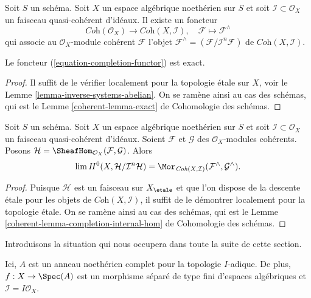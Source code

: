 \noindent
Soit $S$ un schéma. Soit $X$ un espace algébrique noethérien sur $S$ et
soit $\mathcal{I} \subset \mathcal{O}_X$ un faisceau quasi-cohérent d'idéaux.
Il existe un foncteur
\begin{equation}
\label{equation-completion-functor}
\textit{Coh}(\mathcal{O}_X) \longrightarrow \textit{Coh}(X, \mathcal{I}), \quad
\mathcal{F} \longmapsto \mathcal{F}^\wedge
\end{equation}
qui associe au $\mathcal{O}_X$-module cohérent $\mathcal{F}$
l'objet $\mathcal{F}^\wedge = (\mathcal{F}/\mathcal{I}^n\mathcal{F})$
de $\textit{Coh}(X, \mathcal{I})$.

\begin{lemma}
\label{lemma-exact}
Le foncteur (\ref{equation-completion-functor}) est exact.
\end{lemma}

\begin{proof}
Il suffit de le vérifier localement pour la topologie étale sur $X$, voir le
Lemme \ref{lemma-inverse-systems-abelian}.
On se ramène ainsi au cas des schémas, qui est le
Lemme \ref{coherent-lemma-exact} de Cohomologie des schémas.
\end{proof}

\begin{lemma}
\label{lemma-completion-internal-hom}
Soit $S$ un schéma. Soit $X$ un espace algébrique noethérien sur $S$ et
soit $\mathcal{I} \subset \mathcal{O}_X$ un faisceau quasi-cohérent d'idéaux.
Soient $\mathcal{F}$ et $\mathcal{G}$ des $\mathcal{O}_X$-modules cohérents. Posons
$\mathcal{H} = \SheafHom_{\mathcal{O}_X}(\mathcal{F}, \mathcal{G})$.
Alors
$$
\lim H^0(X, \mathcal{H}/\mathcal{I}^n\mathcal{H}) =
\Mor_{\textit{Coh}(X, \mathcal{I})}
(\mathcal{F}^\wedge, \mathcal{G}^\wedge).
$$
\end{lemma}

\begin{proof}
Puisque $\mathcal{H}$ est un faisceau sur $X_\etale$ et que l'on dispose de la
descente étale pour les objets de $\textit{Coh}(X, \mathcal{I})$,
il suffit de le démontrer localement pour la topologie étale.
On se ramène ainsi au cas des schémas, qui est le Lemme
\ref{coherent-lemma-completion-internal-hom} de Cohomologie des schémas.
\end{proof}

\noindent
Introduisons la situation qui nous occupera dans toute la
suite de cette section.

\begin{situation}
\label{situation-existence}
Ici, $A$ est un anneau noethérien complet pour la topologie $I$-adique.
De plus, $f : X \to \Spec(A)$ est un morphisme séparé de type fini
d'espaces algébriques et $\mathcal{I} = I\mathcal{O}_X$.
\end{situation}

